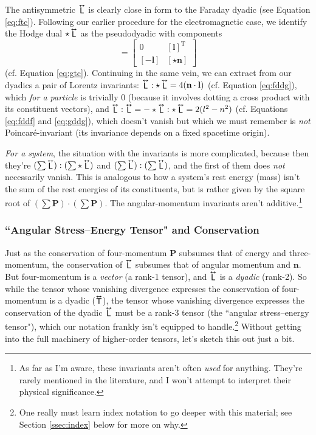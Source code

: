 \documentclass[12pt]{article}
\renewcommand{\vv}[1]{\mathbf{#1}}
\newcommand{\tightoverset}[2]{%
  \mathop{#2}\limits^{\vbox to -.5ex{\kern-0.75ex\hbox{$#1$}\vss}}}
\newcommand{\inlinedy}[1]{\tightoverset{\text{\tiny$\bm\leftrightarrow$}}{#1}}
\newcommand{\capdy}[1]{ \overset{ \text{\tiny$\bm\leftrightarrow$} }{\vphantom{\text{\small{A}}}\smash{#1}} }
\begin{document}
The antisymmetric $\inlinedy{\mathsf{L}}$ is clearly close in form to the Faraday dyadic (see Equation \ref{eq:ftc}). Following our earlier procedure for the electromagnetic case, we identify the Hodge dual $\star \inlinedy{\mathsf{L}}$ as the pseudodyadic with components
\begin{equation*}
[ \star \capdy{\mathsf{L}} ]
=
\begin{bmatrix}
0 & [ \vv l ]^\mathrm{T} \\[1ex]
[ - \vv l ] & [ \star \vv n ]
\end{bmatrix}
\end{equation*}
(cf. Equation \ref{eq:gtc}). Continuing in the same vein, we can extract from our dyadics a pair of Lorentz invariants: $\inlinedy{\mathsf{L}} : \star \inlinedy{\mathsf{L}} =  4 ( \vv n \cdot \vv l )$ (cf. Equation \ref{eq:fddg}), which \emph{for a particle} is trivially $0$ (because it involves dotting a cross product with its constituent vectors), and $\inlinedy{\mathsf{L}} : \inlinedy{\mathsf{L}} = - \star \inlinedy{\mathsf{L}} : \star \inlinedy{\mathsf{L}} = 2 ( l^2 - n^2 )$ (cf. Equations \ref{eq:fddf} and \ref{eq:gddg}), which doesn't vanish but which we must remember is \emph{not} Poincar\'e-invariant (its invariance depends on a fixed spacetime origin).

\emph{For a system}, the situation with the invariants is more complicated, because then they're $( \sum \inlinedy{\mathsf{L}} ) : ( \sum \star \inlinedy{\mathsf{L}} )$ and $( \sum \inlinedy{\mathsf{L}} ) : ( \sum \inlinedy{\mathsf{L}} )$, and the first of them does \emph{not} necessarily vanish. This is analogous to how a system's rest energy (mass) isn't the sum of the rest energies of its constituents, but is rather given by the square root of $(\sum \vv P) \cdot (\sum \vv P)$. The angular-momentum invariants aren't additive.\footnote{As far as I'm aware, these invariants aren't often \emph{used} for anything. They're rarely mentioned in the literature, and I won't attempt to interpret their physical significance.}

\subsubsection[“Angular Stress--Energy Tensor” and Conservation]{``Angular Stress--Energy Tensor" and Conservation}

Just as the conservation of four-momentum $\vv P$ subsumes that of energy and three-momentum, the conservation of $\inlinedy{\mathsf{L}}$ subsumes that of angular momentum and $\vv n$. But four-momentum is a \emph{vector} (a rank-1 tensor), and $\inlinedy{\mathsf{L}}$ is a \emph{dyadic} (rank-2). So while the tensor whose vanishing divergence expresses the conservation of four-momentum is a dyadic ($\inlinedy{\mathsf{T}}$), the tensor whose vanishing divergence expresses the conservation of the dyadic $\inlinedy{\mathsf{L}}$ must be a rank-3 tensor (the ``angular stress--energy tensor"), which our notation frankly isn't equipped to handle.\footnote{One really must learn index notation to go deeper with this material; see Section \ref{ssec:index} below for more on why.} Without getting into the full machinery of higher-order tensors, let's sketch this out just a bit.
\end{document}
